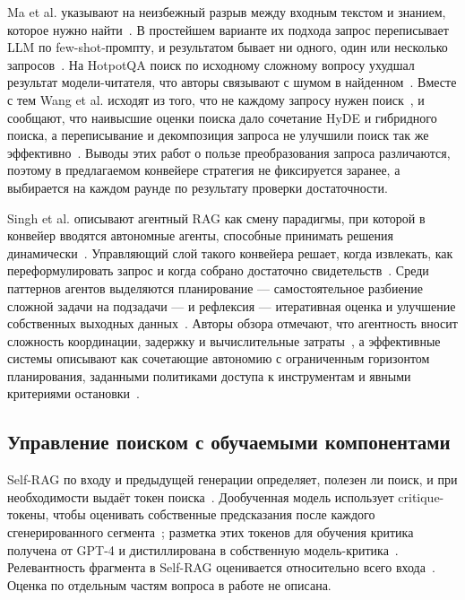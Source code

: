 \documentclass{misisarticle}
\begin{document}
Ma et al. указывают на неизбежный разрыв между входным текстом и знанием, которое нужно найти~\cite{ma2023query}. %
В простейшем варианте их подхода запрос переписывает LLM по few-shot-промпту, и результатом бывает ни одного, один или несколько запросов~\cite{ma2023query}. %
На HotpotQA поиск по исходному сложному вопросу ухудшал результат модели-читателя, что авторы связывают с шумом в найденном~\cite{ma2023query}. %
Вместе с тем Wang et al. исходят из того, что не каждому запросу нужен поиск~\cite{wang2024searching}, %
и сообщают, что наивысшие оценки поиска дало сочетание HyDE и гибридного поиска, а переписывание и декомпозиция запроса не улучшили поиск так же эффективно~\cite{wang2024searching}. %
Выводы этих работ о пользе преобразования запроса различаются, поэтому в предлагаемом конвейере стратегия не фиксируется заранее, а выбирается на каждом раунде по результату проверки достаточности.

Singh et al. описывают агентный RAG как смену парадигмы, при которой в конвейер вводятся автономные агенты, способные принимать решения динамически~\cite{singh2025agentic}. %
Управляющий слой такого конвейера решает, когда извлекать, как переформулировать запрос и когда собрано достаточно свидетельств~\cite{singh2025agentic}. %
Среди паттернов агентов выделяются планирование --- самостоятельное разбиение сложной задачи на подзадачи --- и рефлексия --- итеративная оценка и улучшение собственных выходных данных~\cite{singh2025agentic}. %
Авторы обзора отмечают, что агентность вносит сложность координации, задержку и вычислительные затраты~\cite{singh2025agentic}, %
а эффективные системы описывают как сочетающие автономию с ограниченным горизонтом планирования, заданными политиками доступа к инструментам и явными критериями остановки~\cite{singh2025agentic}. %

\subsection{Управление поиском с обучаемыми компонентами}

Self-RAG по входу и предыдущей генерации определяет, полезен ли поиск, и при необходимости выдаёт токен поиска~\cite{asai2023selfrag}. %
Дообученная модель использует critique-токены, чтобы оценивать собственные предсказания после каждого сгенерированного сегмента~\cite{asai2023selfrag}; %
разметка этих токенов для обучения критика получена от GPT-4 и дистиллирована в собственную модель-критика~\cite{asai2023selfrag}. %
Релевантность фрагмента в Self-RAG оценивается относительно всего входа~\cite{asai2023selfrag}. %
Оценка по отдельным частям вопроса в работе не описана.
\end{document}
